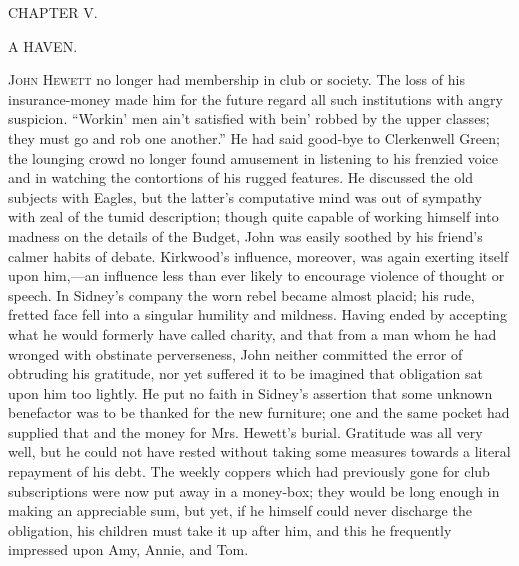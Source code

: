 {}

{CHAPTER V.}

A HAVEN.

\textsc{John Hewett} no longer had membership in club or society. The
loss of his insurance-money made him for the future regard all such
institutions with angry suspicion. ``Workin' men ain't satisfied with
bein' robbed by the upper classes; they must go and rob one another.''
He had said good-bye to Clerkenwell Green; the lounging crowd no longer
found amusement in listening to his frenzied voice and in watching the
contortions of his rugged features. He discussed the old subjects with
Eagles, but the latter's computative mind was out of sympathy with zeal
of the tumid description; though quite capable of working himself into
madness on the details of the Budget, John was easily soothed by his
friend's calmer habits of debate. Kirkwood's influence, moreover, was
again exerting itself {}upon him,---an influence less than ever likely
to encourage violence of thought or speech. In Sidney's company the worn
rebel became almost placid; his rude, fretted face fell into a singular
humility and mildness. Having ended by accepting what he would formerly
have called charity, and that from a man whom he had wronged with
obstinate perverseness, John neither committed the error of obtruding
his gratitude, nor yet suffered it to be imagined that obligation sat
upon him too lightly. He put no faith in Sidney's assertion that some
unknown benefactor was to be thanked for the new furniture; one and the
same pocket had supplied that and the money for Mrs. Hewett's burial.
Gratitude was all very well, but he could not have rested without taking
some measures towards a literal repayment of his debt. The weekly
coppers which had previously gone for club subscriptions were now put
away in a money-box; they would be long enough in making an appreciable
sum, but yet, if he himself could never discharge the obligation, his
children must take it up after him, and this he frequently impressed
upon Amy, Annie, and Tom.

